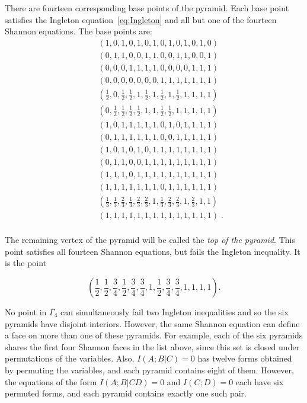 \documentclass[10pt,journal]{IEEEtran}
\begin{document}
There are fourteen corresponding base points of the pyramid.  Each base point satisfies
the Ingleton equation~\eqref{eq:Ingleton} and all but one of the fourteen Shannon equations.
The base points are:
\begin{eqnarray*}
&&(1,0,1,0,1,0,1,0,1,0,1,0,1,0)\\
&&(0,1,1,0,0,1,1,0,0,1,1,0,0,1)\\
&&(0,0,0,1,1,1,1,0,0,0,0,1,1,1)\\
&&(0,0,0,0,0,0,0,1,1,1,1,1,1,1)\\
&&(\frac{1}{2},0,\frac{1}{2},\frac{1}{2},1,\frac{1}{2},1,\frac{1}{2},1,\frac{1}{2},1,1,1,1)\\
&&(0,\frac{1}{2},\frac{1}{2},\frac{1}{2},\frac{1}{2},1,1,\frac{1}{2},\frac{1}{2},1,1,1,1,1)\\
&&(1,0,1,1,1,1,1,0,1,0,1,1,1,1)\\
&&(0,1,1,1,1,1,1,0,0,1,1,1,1,1)\\
&&(1,0,1,0,1,0,1,1,1,1,1,1,1,1)\\
&&(0,1,1,0,0,1,1,1,1,1,1,1,1,1)\\
&&(1,1,1,0,1,1,1,1,1,1,1,1,1,1)\\
&&(1,1,1,1,1,1,1,0,1,1,1,1,1,1)\\
&&(\frac{1}{3},\frac{1}{3},\frac{2}{3},\frac{1}{3},\frac{2}{3},\frac{2}{3},1,\frac{1}{3},\frac{2}{3},\frac{2}{3},1,\frac{2}{3},1,1)\\
&&(1,1,1,1,1,1,1,1,1,1,1,1,1,1)\; .\\
\end{eqnarray*}

The remaining vertex of the pyramid will be called the \textit{top of the pyramid}.  This point satisfies all
fourteen Shannon equations, but fails the Ingleton inequality.  It is the point

\begin{equation}\label{top}
(\frac{1}{2},\frac{1}{2},\frac{3}{4},\frac{1}{2},\frac{3}{4},\frac{3}{4},1, \frac{1}{2},\frac{3}{4},\frac{3}{4},1,1,1,1).
\end{equation}

No point in $\Gamma_4$ can simultaneously fail two Ingleton inequalities and so
the six pyramids have disjoint interiors.  However, the same Shannon equation can define a face on more than one of these pyramids.
For example, each of the six pyramids shares the first four Shannon faces in the list above, since
this set is closed under permutations of the variables.  Also,
$I(A;B|C) = 0$ has twelve forms obtained by permuting the variables, and each pyramid contains eight of them.
However, the equations
of the form $I(A;B|CD) = 0$ and $I(C;D) = 0$ each have six permuted forms, and each pyramid
contains exactly one such pair.
\end{document}
